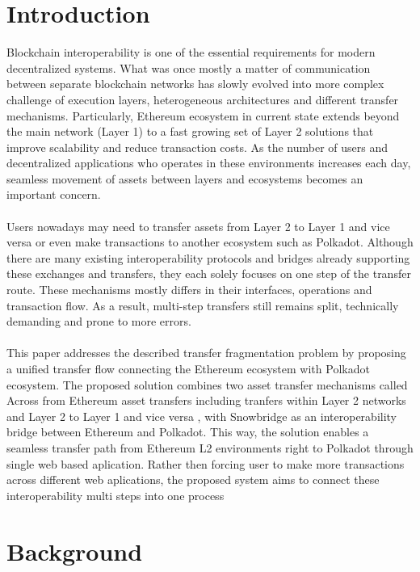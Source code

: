 \documentclass[conference]{IEEEtran}
\begin{document}
\section{Introduction}
Blockchain interoperability is one of the essential requirements for modern decentralized systems. What was once mostly a matter of communication between separate blockchain networks has slowly evolved into more complex challenge of execution layers, heterogeneous architectures and different transfer mechanisms. Particularly, Ethereum ecosystem in current state extends beyond the main network (Layer 1) to a fast growing set of Layer 2 solutions that improve scalability and reduce transaction costs. As the number of users and decentralized applications who operates in these environments increases each day, seamless movement of assets between layers and ecosystems becomes an important concern.
\\
\\
Users nowadays may need to transfer assets from Layer 2 to Layer 1 and vice versa or even make transactions to another ecosystem such as Polkadot. Although there are many existing interoperability protocols and bridges already supporting these exchanges and transfers, they each solely focuses on one step of the transfer route.  These mechanisms mostly differs in their interfaces, operations and transaction flow. As a result, multi-step transfers still remains split, technically demanding and prone to more errors.
\\
\\
This paper addresses the described transfer fragmentation problem by proposing a unified transfer flow connecting the Ethereum ecosystem with Polkadot ecosystem. The proposed solution combines two asset transfer mechanisms called Across from Ethereum asset transfers including tranfers within Layer 2 networks and Layer 2 to Layer 1 and vice versa , with Snowbridge as an interoperability bridge between  Ethereum and Polkadot. This way, the solution enables a seamless transfer path from Ethereum L2 environments right to Polkadot through single web based aplication. Rather then forcing user to make more transactions across different web aplications, the proposed system  aims to connect  these interoperability  multi steps into one process



\section{Background}
\end{document}
